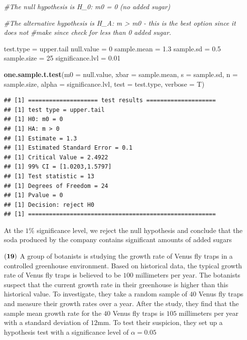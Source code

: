 \documentclass[
]{article}
\newenvironment{Shaded}{\begin{snugshade}}{\end{snugshade}}
\newcommand{\AttributeTok}[1]{\textcolor[rgb]{0.13,0.29,0.53}{#1}}
\newcommand{\CommentTok}[1]{\textcolor[rgb]{0.56,0.35,0.01}{\textit{#1}}}
\newcommand{\DecValTok}[1]{\textcolor[rgb]{0.00,0.00,0.81}{#1}}
\newcommand{\FloatTok}[1]{\textcolor[rgb]{0.00,0.00,0.81}{#1}}
\newcommand{\FunctionTok}[1]{\textcolor[rgb]{0.13,0.29,0.53}{\textbf{#1}}}
\newcommand{\NormalTok}[1]{#1}
\newcommand{\OtherTok}[1]{\textcolor[rgb]{0.56,0.35,0.01}{#1}}
\newcommand{\StringTok}[1]{\textcolor[rgb]{0.31,0.60,0.02}{#1}}
\begin{document}
\begin{Shaded}
\begin{Highlighting}[]
\CommentTok{\#The null hypothesis is H\_0: m0 = 0 (no added sugar)}

\CommentTok{\#The alternative hypothesis is H\_A: m \textgreater{} m0 {-} this is the best option since it does not }
\CommentTok{\#make since check for less than 0 added sugar. }

\NormalTok{test.type }\OtherTok{=} \StringTok{\textquotesingle{}upper.tail\textquotesingle{}}
\NormalTok{null.value }\OtherTok{=} \DecValTok{0}
\NormalTok{sample.mean }\OtherTok{=} \FloatTok{1.3}
\NormalTok{sample.sd }\OtherTok{=} \FloatTok{0.5}
\NormalTok{sample.size }\OtherTok{=} \DecValTok{25}
\NormalTok{significance.lvl }\OtherTok{=} \FloatTok{0.01}

\FunctionTok{one.sample.t.test}\NormalTok{(}\AttributeTok{m0 =}\NormalTok{ null.value,}
                  \AttributeTok{xbar =}\NormalTok{ sample.mean,}
                  \AttributeTok{s =}\NormalTok{ sample.sd,}
                  \AttributeTok{n =}\NormalTok{ sample.size, }
                  \AttributeTok{alpha =}\NormalTok{ significance.lvl,}
                  \AttributeTok{test =}\NormalTok{ test.type,}
                  \AttributeTok{verbose =}\NormalTok{ T)}
\end{Highlighting}
\end{Shaded}

\begin{verbatim}
## [1] ==================== test results ====================
## [1] test type = upper.tail
## [1] H0: m0 = 0
## [1] HA: m > 0
## [1] Estimate = 1.3
## [1] Estimated Standard Error = 0.1
## [1] Critical Value = 2.4922
## [1] 99% CI = [1.0203,1.5797]
## [1] Test statistic = 13
## [1] Degrees of Freedom = 24
## [1] Pvalue = 0
## [1] Decision: reject H0
## [1] ======================================================
\end{verbatim}

{At the \(1\%\) significance level, we reject the null hypothesis and
conclude that the soda produced by the company contains significant
amounts of added sugars }

\(\bf (19)\) A group of botanists is studying the growth rate of Venus
fly traps in a controlled greenhouse environment. Based on historical
data, the typical growth rate of Venus fly traps is believed to be
\(100\) millimeters per year. The botanists suspect that the current
growth rate in their greenhouse is higher than this historical value. To
investigate, they take a random sample of \(40\) Venus fly traps and
measure their growth rates over a year. After the study, they find that
the sample mean growth rate for the \(40\) Venus fly traps is \(105\)
millimeters per year with a standard deviation of \(12\)mm. To test
their suspicion, they set up a hypothesis test with a significance level
of \(\alpha = 0.05\)
\end{document}
